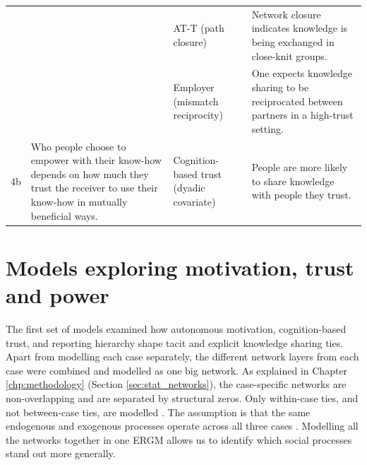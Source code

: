 \begin{table}
{\begin{tabular}{p{0.5cm} p{6cm} p{6cm} p{8cm}}
& & AT-T (path closure) & Network closure indicates knowledge is being exchanged in close-knit groups. \\
& & Employer (mismatch reciprocity) & One expects knowledge sharing to be reciprocated between partners in a high-trust setting. \\ \midrule
4b & Who people choose to empower with their know-how depends on how much they trust the receiver to use their know-how in mutually beneficial ways. & Cognition-based trust (dyadic covariate) & People are more likely to share knowledge with people they trust. \\ \bottomrule
\end{tabular}%
}
\end{table}

\section{Models exploring motivation, trust and power}

The first set of models examined how autonomous motivation, cognition-based trust, and reporting hierarchy shape tacit and explicit knowledge sharing ties. Apart from modelling each case separately, the different network layers from each case were combined and modelled as one big network. As explained in Chapter \ref{chp:methodology} (Section \ref{sec:stat_networks}), the case-specific networks are non-overlapping and are separated by structural zeros. Only within-case ties, and not between-case ties, are modelled \citep{lusher2012trust}. The assumption is that the same endogenous and exogenous processes operate across all three cases \citep{kalish2013brain}. Modelling all the networks together in one ERGM allows us to identify which social processes stand out more generally. \medskip

